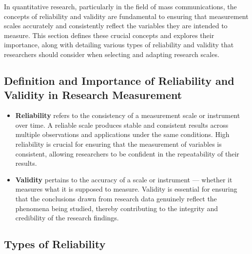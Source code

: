 \documentclass[
]{book}
\begin{document}
In quantitative research, particularly in the field of mass communications, the concepts of reliability and validity are fundamental to ensuring that measurement scales accurately and consistently reflect the variables they are intended to measure. This section defines these crucial concepts and explores their importance, along with detailing various types of reliability and validity that researchers should consider when selecting and adapting research scales.

\hypertarget{definition-and-importance-of-reliability-and-validity-in-research-measurement}{%
\subsection*{Definition and Importance of Reliability and Validity in Research Measurement}\label{definition-and-importance-of-reliability-and-validity-in-research-measurement}}

\begin{itemize}
\item
  \textbf{Reliability} refers to the consistency of a measurement scale or instrument over time. A reliable scale produces stable and consistent results across multiple observations and applications under the same conditions. High reliability is crucial for ensuring that the measurement of variables is consistent, allowing researchers to be confident in the repeatability of their results.
\item
  \textbf{Validity} pertains to the accuracy of a scale or instrument --- whether it measures what it is supposed to measure. Validity is essential for ensuring that the conclusions drawn from research data genuinely reflect the phenomena being studied, thereby contributing to the integrity and credibility of the research findings.
\end{itemize}

\hypertarget{types-of-reliability}{%
\subsection{Types of Reliability}\label{types-of-reliability}}
\end{document}
